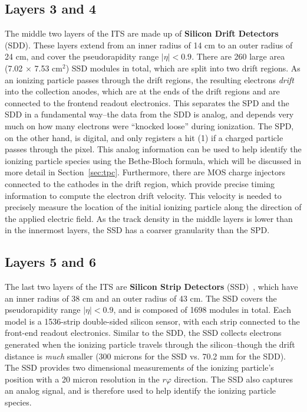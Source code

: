 \subsection{Layers 3 and 4}
The middle two layers of the ITS are made up of \textbf{Silicon Drift Detectors} (SDD)\cite{ITSSDD}. These layers extend from an inner radius of 14 cm to an outer radius of 24 cm, and cover the pseudorapidity range $|\eta| < 0.9$. There are 260 large area (7.02 $\times$ 7.53 cm$^2$) SSD modules in total, which are split into two drift regions. As an ionizing particle passes through the drift regions, the resulting electrons \textit{drift} into the collection anodes, which are at the ends of the drift regions and are connected to the frontend readout electronics. This separates the SPD and the SDD in a fundamental way--the data from the SDD is analog, and depends very much on how many electrons were ``knocked loose'' during ionization. The SPD, on the other hand, is digital, and only registers a hit (1) if a charged particle passes through the pixel. This analog information can be used to help identify the ionizing particle species using the Bethe-Bloch formula, which will be discussed in more detail in Section~\ref{sec:tpc}. Furthermore, there are MOS charge injectors~\cite{MOSCharge} connected to the cathodes in the drift region, which provide precise timing information to compute the electron drift velocity. This velocity is needed to precisely measure the location of the initial ionizing particle along the direction of the applied electric field. As the track density in the middle layers is lower than in the innermost layers, the SSD has a coarser granularity than the SPD.

\subsection{Layers 5 and 6}
The last two layers of the ITS are \textbf{Silicon Strip Detectors} (SSD)~\cite{ITSSSD}, which have an inner radius of 38 cm and an outer radius of 43 cm. The SSD covers the pseudorapidity range $|\eta| < 0.9$, and is composed of 1698 modules in total. Each model is a 1536-strip double-sided silicon sensor, with each strip connected to the front-end readout electronics. Similar to the SDD, the SSD collects electrons generated when the ionizing particle travels through the silicon--though the drift distance is \textit{much} smaller (300 microns for the SSD vs. 70.2 mm for the SDD). The SSD provides two dimensional measurements of the ionizing particle's position with a 20 micron resolution in the $r\varphi$ direction. The SSD also captures an analog signal, and is therefore used to help identify the ionizing particle species.


